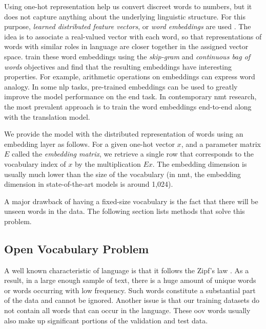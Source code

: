 Using one-hot representation help us convert discreet words to numbers, but it
does not capture anything about the underlying linguistic structure.  For this
purpose, \emph{learned distributed feature vectors}, or \emph{word embeddings}
are used \citep{bengio2003neural, collobert-weston-2007-fast}. The idea is to
associate a real-valued vector with each word, so that representations of words
with similar roles in language are closer together in the assigned vector
space. \citet{mikolov-etal-2013-distributed} train these word embeddings using
the \emph{skip-gram} and \emph{continuous bag of words} objectives and find
that the resulting embeddings have interesting properties. For example,
arithmetic operations on embeddings can express word analogy.  In some \ac{nlp}
tasks, pre-trained embeddings can be used to greatly improve the model
performance on the end task. In contemporary \ac{nmt} research, the most
prevalent approach is to train the word embeddings end-to-end along with the
translation model.

We provide the model with the distributed representation of words using an
embedding layer as follows. For a given one-hot vector $x$, and a
parameter matrix $E$ called the \emph{embedding matrix}, we retrieve a single
row that corresponds to the vocabulary index of $x$ by the
multiplication $E x$.
The embedding dimension is usually much lower than the size of the vocabulary
(in \ac{nmt}, the embedding dimension in state-of-the-art models is around
1,024).

A major drawback of having a fixed-size vocabulary is the fact that there will
be unseen words in the data. The following section lists methods that solve
this problem.

\subsection{Open Vocabulary Problem}

A well known characteristic of language is that it follows the Zipf's law
\citep{zipf1949human}. As a result, in a large enough sample of text, there is
a huge amount of unique words or words occurring with low frequency. Such words
constitute a substantial part of the data and cannot be ignored.  Another issue
is that our training datasets do not contain all words that can occur in the
language. These \ac{oov} words usually also make up significant portions of the
validation and test data.


